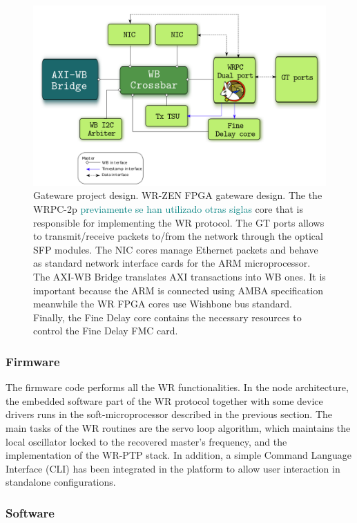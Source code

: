 \begin{figure}[H] \centering
	\includegraphics[scale=0.4]{img/gateware_first_level} \caption{Gateware
	project design. WR-ZEN FPGA gateware design. The the WRPC-2p 
	\textcolor{teal}{previamente se han utilizado otras siglas} core that is 
	responsible for
	implementing the WR protocol. The GT ports allows to transmit/receive
	packets to/from the network through the optical SFP modules. The NIC
	cores manage Ethernet packets and behave as standard network interface
	cards for the ARM microprocessor. The AXI-WB Bridge translates AXI
	transactions into WB ones. It is important because the ARM is connected
	using AMBA specification meanwhile the WR FPGA cores use Wishbone bus
	standard. Finally, the Fine Delay core contains the necessary resources to
control the Fine Delay FMC card.} \label{fig:gateware_first_level} \end{figure}

\subsubsection{Firmware} \label{subsec:firmware}

The firmware code performs all the WR functionalities. 
In the node architecture, the embedded software part of the WR
protocol together with some device drivers runs in the soft-microprocessor described in
the previous section. The main tasks of the WR routines are the servo loop
algorithm, which maintains the local oscillator locked to the recovered master's frequency,
and the implementation of the WR-PTP stack. In addition, a simple
Command Language Interface (CLI) has been integrated in the platform to allow user interaction
in standalone configurations.

\subsubsection{Software} \label{subsec:software}

